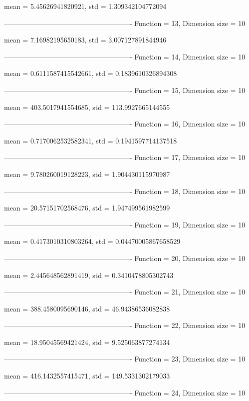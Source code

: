 mean = 5.45626941820921, std = 1.309342104772094

-------------------------------------------------------
Function = 13, Dimension size = 10


mean = 7.16982195650183, std = 3.007127891844946

-------------------------------------------------------
Function = 14, Dimension size = 10


mean = 0.6111587415542661, std = 0.1839610326894308

-------------------------------------------------------
Function = 15, Dimension size = 10


mean = 403.5017941554685, std = 113.9927665144555

-------------------------------------------------------
Function = 16, Dimension size = 10


mean = 0.7170062532582341, std = 0.1941597714137518

-------------------------------------------------------
Function = 17, Dimension size = 10


mean = 9.780260019128223, std = 1.904430115970987

-------------------------------------------------------
Function = 18, Dimension size = 10


mean = 20.57151702568476, std = 1.947499561982599

-------------------------------------------------------
Function = 19, Dimension size = 10


mean = 0.4173010310803264, std = 0.04470005867658529

-------------------------------------------------------
Function = 20, Dimension size = 10


mean = 2.445648562891419, std = 0.3410478805302743

-------------------------------------------------------
Function = 21, Dimension size = 10


mean = 388.4580095690146, std = 46.94386536082838

-------------------------------------------------------
Function = 22, Dimension size = 10


mean = 18.95045569421424, std = 9.525063877274134

-------------------------------------------------------
Function = 23, Dimension size = 10


mean = 416.1432557415471, std = 149.5331302179033

-------------------------------------------------------
Function = 24, Dimension size = 10


